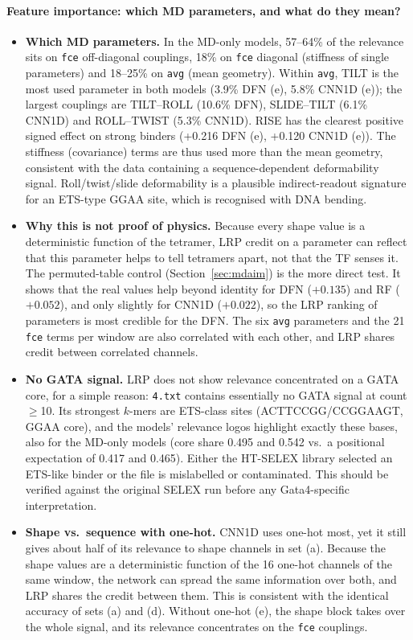\paragraph{Feature importance: which MD parameters, and what do they mean?}
\begin{itemize}
\item \textbf{Which MD parameters.} In the MD-only models, 57--64\% of the relevance sits on \texttt{fce} off-diagonal couplings, 18\% on \texttt{fce} diagonal (stiffness of single parameters) and 18--25\% on \texttt{avg} (mean geometry). Within \texttt{avg}, TILT is the most used parameter in both models (3.9\% DFN (e), 5.8\% CNN1D (e)); the largest couplings are TILT--ROLL (10.6\% DFN), SLIDE--TILT (6.1\% CNN1D) and ROLL--TWIST (5.3\% CNN1D). RISE has the clearest positive signed effect on strong binders (+0.216 DFN (e), +0.120 CNN1D (e)). The stiffness (covariance) terms are thus used more than the mean geometry, consistent with the data containing a sequence-dependent deformability signal. Roll/twist/slide deformability is a plausible indirect-readout signature for an ETS-type GGAA site, which is recognised with DNA bending.
\item \textbf{Why this is not proof of physics.} Because every shape value is a deterministic function of the tetramer, LRP credit on a parameter can reflect that this parameter helps to tell tetramers apart, not that the TF senses it. The permuted-table control (Section~\ref{sec:mdaim}) is the more direct test. It shows that the real values help beyond identity for DFN ($+0.135$) and RF ($+0.052$), and only slightly for CNN1D ($+0.022$), so the LRP ranking of parameters is most credible for the DFN. The six \texttt{avg} parameters and the 21 \texttt{fce} terms per window are also correlated with each other, and LRP shares credit between correlated channels.
\item \textbf{No GATA signal.} LRP does not show relevance concentrated on a GATA core, for a simple reason: \texttt{4.txt} contains essentially no GATA signal at count $\geq$10. Its strongest $k$-mers are ETS-class sites (ACTTCCGG/CCGGAAGT, GGAA core), and the models' relevance logos highlight exactly these bases, also for the MD-only models (core share 0.495 and 0.542 vs.\ a positional expectation of 0.417 and 0.465). Either the HT-SELEX library selected an ETS-like binder or the file is mislabelled or contaminated. This should be verified against the original SELEX run before any Gata4-specific interpretation.
\item \textbf{Shape vs.\ sequence with one-hot.} CNN1D uses one-hot most, yet it still gives about half of its relevance to shape channels in set (a). Because the shape values are a deterministic function of the 16 one-hot channels of the same window, the network can spread the same information over both, and LRP shares the credit between them. This is consistent with the identical accuracy of sets (a) and (d). Without one-hot (e), the shape block takes over the whole signal, and its relevance concentrates on the \texttt{fce} couplings.

\end{itemize}
